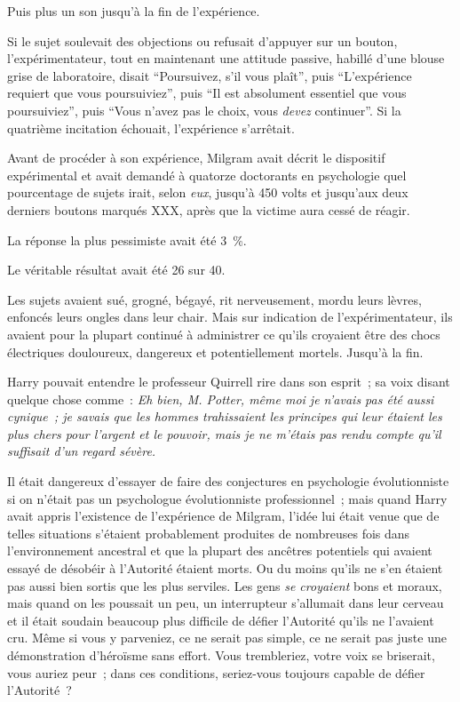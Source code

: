 Puis plus un son jusqu'à la fin de l'expérience.

Si le sujet soulevait des objections ou refusait d'appuyer sur un bouton, l'expérimentateur, tout en maintenant une attitude passive, habillé d'une blouse grise de laboratoire, disait “Poursuivez, s'il vous plaît”, puis “L'expérience requiert que vous poursuiviez”, puis “Il est absolument essentiel que vous poursuiviez”, puis “Vous n'avez pas le choix, vous \emph{devez} continuer”.
Si la quatrième incitation échouait, l'expérience s'arrêtait.

Avant de procéder à son expérience, Milgram avait décrit le dispositif expérimental et avait demandé à quatorze doctorants en psychologie quel pourcentage de sujets irait, selon \emph{eux}, jusqu'à 450 volts et jusqu'aux deux derniers boutons marqués XXX, après que la victime aura cessé de réagir.

La réponse la plus pessimiste avait été 3~\%.

Le véritable résultat avait été 26 sur 40.

Les sujets avaient sué, grogné, bégayé, rit nerveusement, mordu leurs lèvres, enfoncés leurs ongles dans leur chair.
Mais sur indication de l'expérimentateur, ils avaient pour la plupart continué à administrer ce qu'ils croyaient être des chocs électriques douloureux, dangereux et potentiellement mortels.
Jusqu'à la fin.

Harry pouvait entendre le professeur Quirrell rire dans son esprit~; sa voix disant quelque chose comme~: \emph{Eh bien, M. Potter, même moi je n'avais pas été aussi cynique~; je savais que les hommes trahissaient les principes qui leur étaient les plus chers pour l'argent et le pouvoir, mais je ne m'étais pas rendu compte qu'il suffisait d'un regard sévère.}

Il était dangereux d'essayer de faire des conjectures en psychologie évolutionniste si on n'était pas un psychologue évolutionniste professionnel~; mais quand Harry avait appris l'existence de l'expérience de Milgram, l'idée lui était venue que de telles situations s'étaient probablement produites de nombreuses fois dans l'environnement ancestral et que la plupart des ancêtres potentiels qui avaient essayé de désobéir à l'Autorité étaient morts.
Ou du moins qu'ils ne s'en étaient pas aussi bien sortis que les plus serviles.
Les gens \emph{se croyaient} bons et moraux, mais quand on les poussait un peu, un interrupteur s'allumait dans leur cerveau et il était soudain beaucoup plus difficile de défier l'Autorité qu'ils ne l'avaient cru.
Même si vous y parveniez, ce ne serait pas simple, ce ne serait pas juste une démonstration d'héroïsme sans effort.
Vous trembleriez, votre voix se briserait, vous auriez peur~; dans ces conditions, seriez-vous toujours capable de défier l'Autorité~?


